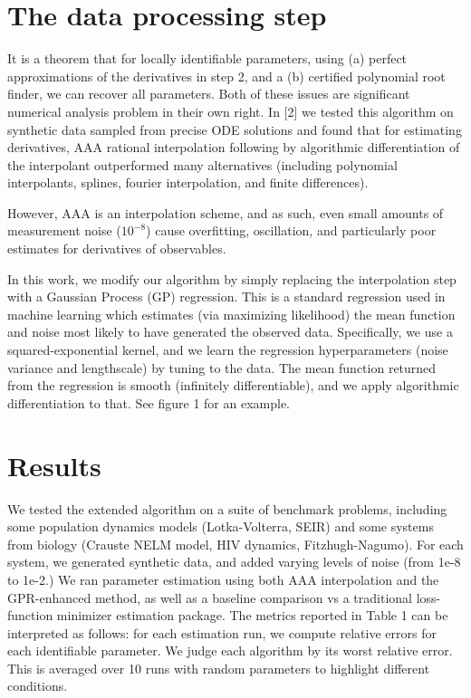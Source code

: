 \documentclass{ifacconf}
\begin{document}
	\section{ The data processing step }
	It is a theorem that for locally identifiable parameters, using (a) perfect approximations of the derivatives in step 2, and a (b) certified polynomial root finder, we can recover all parameters.  Both of these issues are significant numerical analysis problem in their own right.  In [2] we tested this algorithm on synthetic data sampled from precise ODE solutions and found that for estimating derivatives, AAA rational interpolation following by algorithmic differentiation of the interpolant outperformed many alternatives (including polynomial interpolants, splines, fourier interpolation, and finite differences).
	
	However, AAA is an interpolation scheme, and as such, even small amounts of measurement noise ($10^{-8}$) cause overfitting, oscillation, and particularly poor estimates for derivatives of observables.
	
	In this work, we modify our algorithm by simply replacing the interpolation step with a Gaussian Process (GP) regression.  This is a standard regression used in machine learning which estimates (via maximizing likelihood) the mean function and noise most likely to have generated the observed data.  Specifically, we use a squared-exponential kernel, and we learn the regression hyperparameters (noise variance and lengthscale) by tuning to the data.  The mean function returned from the regression is smooth (infinitely differentiable), and we apply algorithmic differentiation to that.  See figure 1 for an example.   
	
	\section{Results}
	We tested the extended algorithm on a suite of benchmark problems, including some population dynamics models (Lotka-Volterra, SEIR) and some systems from biology (Crauste NELM model, HIV dynamics, Fitzhugh-Nagumo).  
	For each system, we generated synthetic data, and added varying levels of noise (from 1e-8 to 1e-2.)  We ran parameter estimation using both AAA interpolation and the GPR-enhanced method, as well as a baseline comparison vs a traditional loss-function minimizer estimation package.  The metrics reported in Table 1 can be interpreted as follows: for each estimation run, we compute relative errors for each identifiable parameter.  We judge each algorithm by its worst relative error.  This is averaged over 10 runs with random parameters to highlight different conditions.
	
\end{document}
